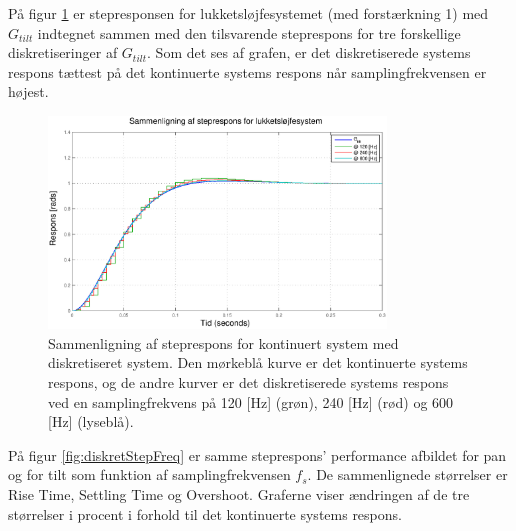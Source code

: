 På figur \ref{fig:diskretTiltStep} er stepresponsen for lukketsløjfesystemet (med forstærkning 1)
med \(G_{tilt}\) indtegnet sammen med den tilsvarende steprespons for tre forskellige diskretiseringer
af \(G_{tilt}\). Som det ses af grafen, er det diskretiserede systems respons tættest
på det kontinuerte systems respons når samplingfrekvensen er højest.
\begin{figure}[!th]
\centering
	\includegraphics[width=0.8\textwidth]{./graphics/diskretTiltStep.eps}
	\captionsetup{width=0.7\textwidth}
\caption[Sammenligning af steprespons mellem kontinuert og diskretiseret system]
{Sammenligning af steprespons for kontinuert system med diskretiseret system.
Den mørkeblå kurve er det kontinuerte systems respons,
og de andre kurver er det diskretiserede systems respons ved en samplingfrekvens på
120 [Hz] (grøn), 240 [Hz] (rød) og 600 [Hz] (lyseblå).}
\label{fig:diskretTiltStep}
\end{figure}
På figur \ref{fig:diskretStepFreq} er samme steprespons' performance afbildet
for pan og for tilt som funktion af samplingfrekvensen \(f_s\).
De sammenlignede størrelser er Rise Time, Settling Time og Overshoot.
Graferne viser ændringen af de tre størrelser i procent i forhold til det kontinuerte systems respons.
